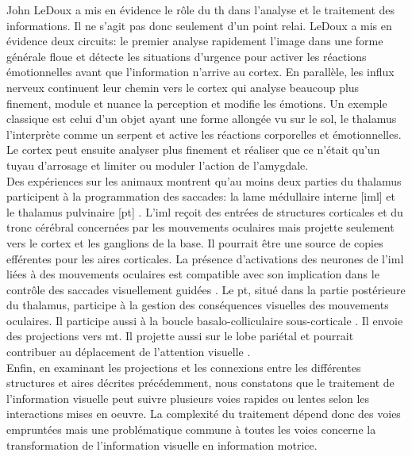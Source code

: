 John LeDoux \cite{Ledoux:1998} a mis en évidence le rôle du \gls{th} dans l'analyse et le traitement des informations. Il ne s'agit pas donc seulement d'un point relai. LeDoux a mis en évidence deux circuits: le premier analyse rapidement l'image dans une forme générale floue et détecte les situations d'urgence pour activer les réactions émotionnelles avant que l'information n'arrive au cortex. En parallèle, les influx nerveux continuent leur chemin vers le cortex qui analyse beaucoup plus finement, module et nuance la perception et modifie les émotions. Un exemple classique est celui d'un objet ayant une forme allongée vu sur le sol, le thalamus l'interprète comme un serpent et active les réactions corporelles et émotionnelles. Le cortex peut ensuite analyser plus finement et réaliser que ce n'était qu'un tuyau d'arrosage et limiter ou moduler l'action de l'amygdale.\\

Des expériences sur les animaux montrent qu'au moins deux parties du thalamus participent à la programmation des saccades: la lame médullaire interne [\gls{iml}] et le thalamus pulvinaire [\gls{pt}] \cite{Schlag:1984,Robinson:1986}. L'\gls{iml} reçoit des entrées de structures corticales et du tronc cérébral concernées par les mouvements oculaires mais projette seulement vers le cortex et les ganglions de la base. Il pourrait être une source de copies efférentes pour les aires corticales. La présence d'activations des neurones de l'\gls{iml} liées à des mouvements oculaires est compatible avec son implication dans le contrôle des saccades visuellement guidées \cite{Schlag:1989}. Le \gls{pt}, situé dans la partie postérieure du thalamus, participe à la gestion des conséquences visuelles des mouvements oculaires. Il participe aussi à la boucle basalo-colliculaire sous-corticale \cite{McHaffie:2005}. Il envoie des projections vers \gls{mt}. Il projette aussi sur le lobe pariétal et pourrait contribuer au déplacement de l'attention visuelle \cite{Benevento:1995, Olshausen:1993}.\\





Enfin, en examinant les projections et les connexions entre les différentes structures et aires décrites précédemment, nous constatons que le traitement de l'information visuelle peut suivre plusieurs voies rapides ou lentes selon les interactions mises en oeuvre. La complexité du traitement dépend donc des voies empruntées mais une problématique commune à toutes les voies concerne la transformation de l'information visuelle en information motrice.\\

